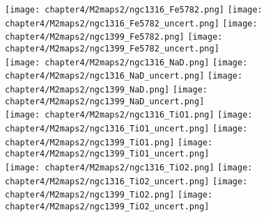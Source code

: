 \begin{figure*}
	\centering
	\texttt{[image: chapter4/M2maps2/ngc1316\_Fe5782.png]}
	\texttt{[image: chapter4/M2maps2/ngc1316\_Fe5782\_uncert.png]}
	\texttt{[image: chapter4/M2maps2/ngc1399\_Fe5782.png]}
	\texttt{[image: chapter4/M2maps2/ngc1399\_Fe5782\_uncert.png]}
	\\
	\texttt{[image: chapter4/M2maps2/ngc1316\_NaD.png]}
	\texttt{[image: chapter4/M2maps2/ngc1316\_NaD\_uncert.png]}
	\texttt{[image: chapter4/M2maps2/ngc1399\_NaD.png]}
	\texttt{[image: chapter4/M2maps2/ngc1399\_NaD\_uncert.png]}
	\\
	\texttt{[image: chapter4/M2maps2/ngc1316\_TiO1.png]}
	\texttt{[image: chapter4/M2maps2/ngc1316\_TiO1\_uncert.png]}
	\texttt{[image: chapter4/M2maps2/ngc1399\_TiO1.png]}
	\texttt{[image: chapter4/M2maps2/ngc1399\_TiO1\_uncert.png]}
	\\
	\texttt{[image: chapter4/M2maps2/ngc1316\_TiO2.png]}
	\texttt{[image: chapter4/M2maps2/ngc1316\_TiO2\_uncert.png]}
	\texttt{[image: chapter4/M2maps2/ngc1399\_TiO2.png]}
	\texttt{[image: chapter4/M2maps2/ngc1399\_TiO2\_uncert.png]}
	\\
	\label{fig:MUSE_stellar2}
\end{figure*}